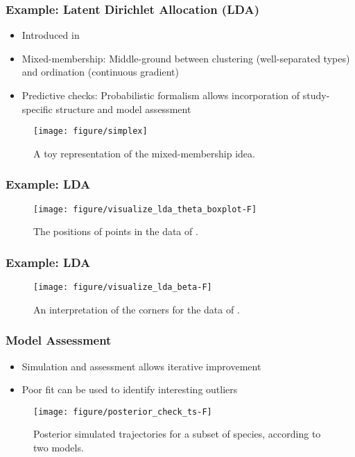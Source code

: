 \documentclass{beamer}
\begin{document}
\begin{frame}
  \frametitle{Example: Latent Dirichlet Allocation (LDA)}
\begin{itemize}
  \item Introduced in \citep{blei2003latent}
  \item Mixed-membership: Middle-ground between clustering (well-separated
    types) and ordination (continuous gradient)
  \item Predictive checks: Probabilistic formalism allows incorporation of
    study-specific structure and model assessment
\end{itemize}  
\begin{figure}[ht]
  \centering
  \texttt{[image: figure/simplex]}
  \caption{A toy representation of the mixed-membership idea.\label{fig:label} }
\end{figure}

\end{frame}

\begin{frame}
  \frametitle{Example: LDA}
 \begin{figure}[ht]
   \centering
   \texttt{[image: figure/visualize\_lda\_theta\_boxplot-F]}\\
   \caption{The positions of points in the data of
     \citep{dethlefsen2011incomplete}. \label{fig:label} }
 \end{figure}
\end{frame}

\begin{frame}
  \frametitle{Example: LDA}
 \begin{figure}[ht]
   \centering
   \texttt{[image: figure/visualize\_lda\_beta-F]}
   \caption{An interpretation of the corners for the data of \citep{dethlefsen2011incomplete}. \label{fig:label} }
 \end{figure}
\end{frame}

\begin{frame}
  \frametitle{Model Assessment}
\begin{itemize}
\item Simulation and assessment allows iterative improvement
\item Poor fit can be used to identify interesting outliers
\end{itemize}
  \begin{figure}[!p]
    \centering
    \texttt{[image: figure/posterior\_check\_ts-F]}
    \caption{Posterior simulated trajectories for a subset of species, according
      to two models.}
  \end{figure} 
\end{frame}
\end{document}
